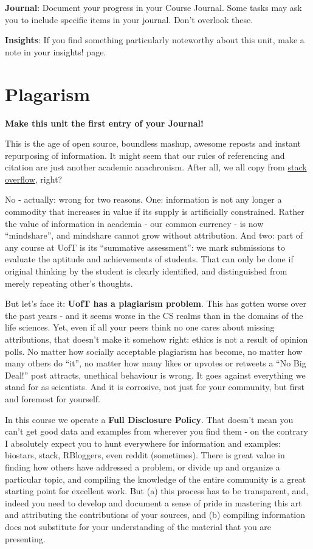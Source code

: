 \documentclass[]{book}
\begin{document}
\textbf{Journal}: Document your progress in your Course Journal. Some
tasks may ask you to include specific items in your journal. Don't
overlook these.

\textbf{Insights}: If you find something particularly noteworthy about
this unit, make a note in your insights! page.

\section{Plagarism}\label{plagarism}

\textbf{Make this unit the first entry of your Journal!}

This is the age of open source, boundless mashup, awesome reposts and
instant repurposing of information. It might seem that our rules of
referencing and citation are just another academic anachronism. After
all, we all copy from \href{https://stackoverflow.com/}{stack overflow},
right?

No - actually: wrong for two reasons. One: information is not any longer
a commodity that increases in value if its supply is artificially
constrained. Rather the value of information in academia - our common
currency - is now ``mindshare'', and mindshare cannot grow without
attribution. And two: part of any course at UofT is its ``summative
assessment'': we mark submissions to evaluate the aptitude and
achievements of students. That can only be done if original thinking by
the student is clearly identified, and distinguished from merely
repeating other's thoughts.

But let's face it: \textbf{UofT has a plagiarism problem}. This has
gotten worse over the past years - and it seems worse in the CS realms
than in the domains of the life sciences. Yet, even if all your peers
think no one cares about missing attributions, that doesn't make it
somehow right: ethics is not a result of opinion polls. No matter how
socially acceptable plagiarism has become, no matter how many others do
``it'', no matter how many likes or upvotes or retweets a ``No Big
Deal!'' post attracts, unethical behaviour is wrong. It goes against
everything we stand for as scientists. And it is corrosive, not just for
your community, but first and foremost for yourself.

In this course we operate a \textbf{Full Disclosure Policy}. That
doesn't mean you can't get good data and examples from wherever you find
them - on the contrary I absolutely expect you to hunt everywhere for
information and examples: biostars, stack, RBloggers, even reddit
(sometimes). There is great value in finding how others have addressed a
problem, or divide up and organize a particular topic, and compiling the
knowledge of the entire community is a great starting point for
excellent work. But (a) this process has to be transparent, and, indeed
you need to develop and document a sense of pride in mastering this art
and attributing the contributions of your sources, and (b) compiling
information does not substitute for your understanding of the material
that you are presenting.
\end{document}

